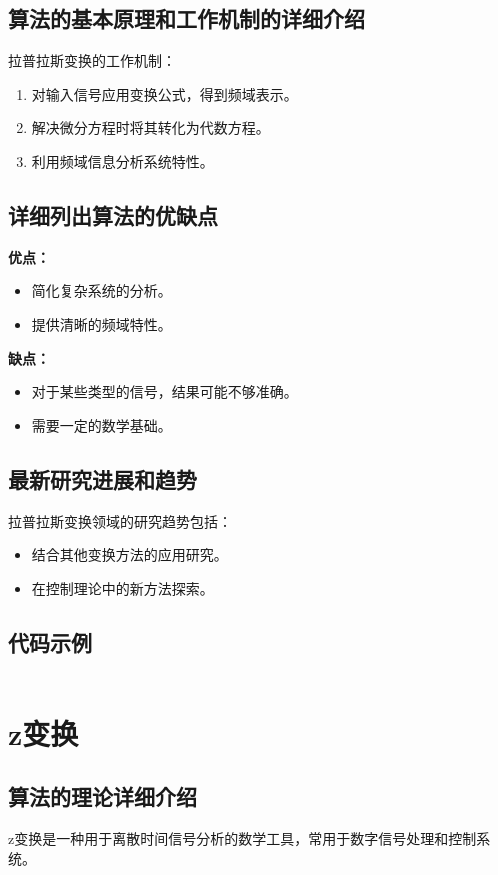 \subsection*{算法的基本原理和工作机制的详细介绍}
拉普拉斯变换的工作机制：
\begin{enumerate}
    \item 对输入信号应用变换公式，得到频域表示。
    \item 解决微分方程时将其转化为代数方程。
    \item 利用频域信息分析系统特性。
\end{enumerate}

\subsection*{详细列出算法的优缺点}
\textbf{优点：}
\begin{itemize}
    \item 简化复杂系统的分析。
    \item 提供清晰的频域特性。
\end{itemize}

\textbf{缺点：}
\begin{itemize}
    \item 对于某些类型的信号，结果可能不够准确。
    \item 需要一定的数学基础。
\end{itemize}

\subsection*{最新研究进展和趋势}
拉普拉斯变换领域的研究趋势包括：
\begin{itemize}
    \item 结合其他变换方法的应用研究。
    \item 在控制理论中的新方法探索。
\end{itemize}
\subsection*{代码示例}
\begin{lstlisting}

\end{lstlisting}


\section{z变换}
\subsection*{算法的理论详细介绍}
z变换是一种用于离散时间信号分析的数学工具，常用于数字信号处理和控制系统。

